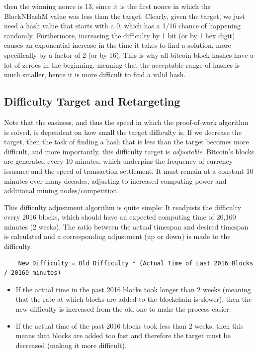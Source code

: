 \documentclass{article}
\begin{document}
    then the winning nonce is 13, since it is the first nonce in which the BlockNHashM value was less than the target. Clearly, given the target, we just need a hash value that starts with a 0, which has a 1/16 chance of happening randomly. Furthermore, increasing the difficulty by 1 bit (or by 1 hex digit) causes an exponential increase in the time it takes to find a solution, more specifically by a factor of 2 (or by 16). This is why all bitcoin block hashes have a lot of zeroes in the beginning, meaning that the acceptable range of hashes is much smaller, hence it is more difficult to find a valid hash.

  \subsection{Difficulty Target and Retargeting}

    Note that the easiness, and thus the speed in which the proof-of-work algorithm is solved, is dependent on how small the target difficulty is. If we decrease the target, then the task of finding a hash that is less than the target becomes more difficult, and more importantly, this difficulty target is \textit{adjustable}. Bitcoin's blocks are generated every 10 minutes, which underpins the frequency of currency issuance and the speed of transaction settlement. It must remain at a constant 10 minutes over many decades, adjusting to increased computing power and additional mining nodes/competition.

    This difficulty adjustment algorithm is quite simple: It readjusts the difficulty every 2016 blocks, which should have an expected computing time of 20,160 minutes (2 weeks). The ratio between the actual timespan and desired timespan is calculated and a corresponding adjustment (up or down) is made to the difficulty.

    \begin{lstlisting}
    New Difficulty = Old Difficulty * (Actual Time of Last 2016 Blocks / 20160 minutes)
    \end{lstlisting}

    \begin{itemize}
      \item If the actual time in the past 2016 blocks took longer than 2 weeks (meaning that the rate at which blocks are added to the blockchain is slower), then the new difficulty is increased from the old one to make the process easier.
      \item If the actual time of the past 2016 blocks took less than 2 weeks, then this means that blocks are added too fast and therefore the target must be decreased (making it more difficult).
    \end{itemize}
\end{document}
